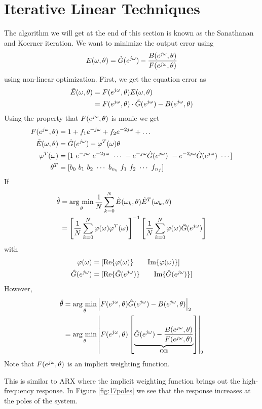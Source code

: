 \section{Iterative Linear Techniques}
The algorithm we will get at the end of this section is known as the Sanathanan and Koerner iteration. We want to minimize the output error using
$$E(\omega,\theta) = \hat{G}(e^{j\omega}) - \frac{B(e^{j\omega},\theta)}{F(e^{j\omega},\theta)}$$
using non-linear optimization. First, we get the equation error as
\begin{align*}
\tilde{E}(\omega,\theta) &= F(e^{j\omega},\theta)E(\omega,\theta) \\
&= F(e^{j\omega},\theta)\cdot\tilde{G}(e^{j\omega}) - B(e^{j\omega},\theta)
\end{align*}
Using the property that $F(e^{j\omega},\theta)$ is monic we get
\begin{align*}
F(e^{j\omega},\theta) &= 1 + f_1e^{-j\omega} + f_2e^{-2j\omega} + \ldots \\
\tilde{E}(\omega,\theta) &= \hat{G}(e^{j\omega}) - \varphi^T(\omega)\theta \\
\varphi^T(\omega) &= [1 ~ e^{-j\omega} ~ e^{-2j\omega} ~ \cdots ~ -e^{-j\omega}\hat{G}(e^{j\omega}) ~ -e^{-2j\omega}\hat{G}(e^{j\omega}) ~ \cdots] \\
\theta^T &= [b_0 ~ b_1 ~ b_2 ~ \cdots ~ b_{n_b} ~ f_1 ~ f_2 ~ \cdots ~ f_{n_f}]
\end{align*}
If
\begin{align*}
\hat{\theta} &= \mathop{\arg\,\min}\limits_\theta \frac{1}{N}\sum_{k=0}^N\tilde{E}(\omega_k,\theta)\tilde{E}^T(\omega_k,\theta) \\
&= \left[\frac{1}{N}\sum_{k=0}^N\varphi(\omega)\varphi^T(\omega)\right]^{-1}\left[\frac{1}{N}\sum_{k=0}^N\varphi(\omega)\hat{G}(e^{j\omega})\right]
\end{align*}
with
\begin{align*}
\varphi(\omega) &= [\text{Re}\{\varphi(\omega)\} \qquad \text{Im}\{\varphi(\omega)\}] \\
\hat{G}(e^{j\omega}) &= [\text{Re}\{\hat{G}(e^{j\omega})\} \qquad \text{Im}\{\hat{G}(e^{j\omega})\}]
\end{align*}
However,
\begin{align*}
\hat{\theta} &= \mathop{\arg\,\min}\limits_\theta \left|F(e^{j\omega},\theta)\hat{G}(e^{j\omega}) - B(e^{j\omega},\theta)\right|_2 \\
&= \mathop{\arg\,\min}\limits_\theta \left|F(e^{j\omega},\theta)\left[\underbrace{\hat{G}(e^{j\omega}) - \frac{B(e^{j\omega},\theta)}{F(e^{j\omega},\theta)}}_{\text{OE}}\right]\right|_2
\end{align*}
Note that $F(e^{j\omega},\theta)$ is an implicit weighting function.

This is similar to ARX where the implicit weighting function brings out the high-frequency response. In Figure \ref{fig:17poles} we see that the response increases at the poles of the system.

